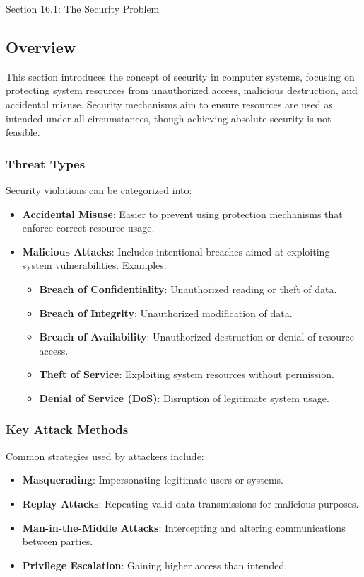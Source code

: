 \begin{notes}{Section 16.1: The Security Problem}
    \subsection*{Overview}

    This section introduces the concept of security in computer systems, focusing on protecting system resources from unauthorized access, malicious destruction, and accidental misuse. Security mechanisms 
    aim to ensure resources are used as intended under all circumstances, though achieving absolute security is not feasible.
    
    \subsubsection*{Threat Types}
    
    Security violations can be categorized into:
    \begin{itemize}
        \item \textbf{Accidental Misuse}: Easier to prevent using protection mechanisms that enforce correct resource usage.
        \item \textbf{Malicious Attacks}: Includes intentional breaches aimed at exploiting system vulnerabilities. Examples:
        \begin{itemize}
            \item \textbf{Breach of Confidentiality}: Unauthorized reading or theft of data.
            \item \textbf{Breach of Integrity}: Unauthorized modification of data.
            \item \textbf{Breach of Availability}: Unauthorized destruction or denial of resource access.
            \item \textbf{Theft of Service}: Exploiting system resources without permission.
            \item \textbf{Denial of Service (DoS)}: Disruption of legitimate system usage.
        \end{itemize}
    \end{itemize}
    
    \subsubsection*{Key Attack Methods}
    
    Common strategies used by attackers include:
    \begin{itemize}
        \item \textbf{Masquerading}: Impersonating legitimate users or systems.
        \item \textbf{Replay Attacks}: Repeating valid data transmissions for malicious purposes.
        \item \textbf{Man-in-the-Middle Attacks}: Intercepting and altering communications between parties.
        \item \textbf{Privilege Escalation}: Gaining higher access than intended.
    \end{itemize}
    

\end{notes}
